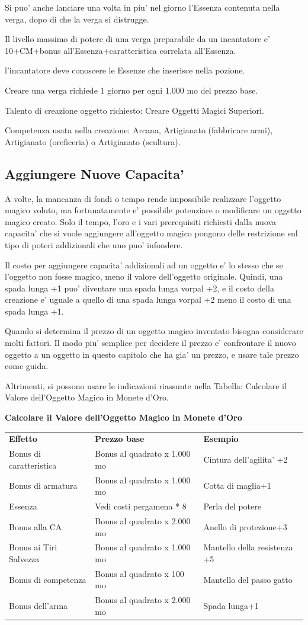 \documentclass[a4paper,11pt,twoside,openany]{book}
\begin{document}
Si puo' anche lanciare una volta in piu' nel giorno l'Essenza contenuta nella verga, dopo di che la verga si distrugge.

Il livello massimo di potere di una verga preparabile da un incantatore e' 10+CM+bonus all'Essenza+caratteristica correlata all'Essenza.

l'incantatore deve conoscere le Essenze che inserisce nella pozione.

Creare una verga richiede 1 giorno per ogni 1.000 mo del prezzo base.

Talento di creazione oggetto richiesto: Creare Oggetti Magici Superiori.

Competenza usata nella creazione: Arcana, Artigianato (fabbricare armi), Artigianato (oreficeria) o Artigianato (scultura).

\subsection{Aggiungere Nuove Capacita'}

A volte, la mancanza di fondi o tempo rende impossibile realizzare l'oggetto magico voluto, ma fortunatamente e' possibile potenziare o modificare un oggetto magico creato. Solo il tempo, l'oro e i vari prerequisiti richiesti dalla nuova capacita' che si vuole aggiungere all'oggetto magico pongono delle restrizione sul tipo di poteri addizionali che uno puo' infondere.

Il costo per aggiungere capacita' addizionali ad un oggetto e' lo stesso che se l'oggetto non fosse magico, meno il valore dell'oggetto originale. Quindi, una spada lunga +1 puo' diventare una spada lunga vorpal +2, e il costo della creazione e' uguale a quello di una spada lunga vorpal +2 meno il costo di una spada lunga +1.

Quando si determina il prezzo di un oggetto magico inventato bisogna considerare molti fattori. Il modo piu' semplice per decidere il prezzo e' confrontare il nuovo oggetto a un oggetto in questo capitolo che ha gia' un prezzo, e usare tale prezzo come guida.

Altrimenti, si possono usare le indicazioni riassunte nella Tabella: Calcolare il Valore dell'Oggetto Magico in Monete d'Oro.

\bigskip

\textbf{Calcolare il Valore dell'Oggetto Magico in Monete d'Oro}

\begin{tabular}{lll}
\toprule
\textbf{Effetto} & \textbf{Prezzo base} & \textbf{Esempio}\tabularnewline
Bonus di caratteristica & Bonus al quadrato x 1.000 mo & Cintura dell'agilita' +2\tabularnewline
Bonus di armatura & Bonus al quadrato x 1.000 mo & Cotta di maglia+1\tabularnewline
Essenza & Vedi costi pergamena {*} 8 & Perla del potere\tabularnewline
Bonus alla CA & Bonus al quadrato x 2.000 mo & Anello di protezione+3\tabularnewline
Bonus ai Tiri Salvezza & Bonus al quadrato x 1.000 mo & Mantello della resistenza +5\tabularnewline
Bonus di competenza & Bonus al quadrato x 100 mo & Mantello del passo gatto\tabularnewline
Bonus dell'arma & Bonus al quadrato x 2.000 mo & Spada lunga+1\tabularnewline
\end{tabular}
\end{document}
